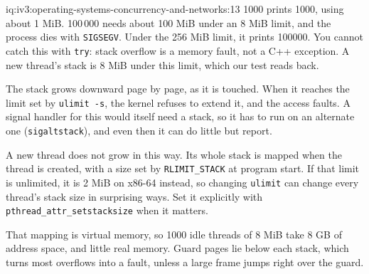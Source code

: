 \begin{solution}{iq:iv3:operating-systems-concurrency-and-networks:13}
1000 prints 1000, using about 1 MiB. 100\,000 needs about 100 MiB under an 8 MiB limit, and the process dies with \texttt{SIGSEGV}. Under the 256 MiB limit, it prints 100000. You cannot catch this with \texttt{try}: stack overflow is a memory fault, not a C++ exception. A new thread's stack is 8 MiB under this limit, which our test reads back.

The stack grows downward page by page, as it is touched. When it reaches the limit set by \texttt{ulimit -s}, the kernel refuses to extend it, and the access faults. A signal handler for this would itself need a stack, so it has to run on an alternate one (\texttt{sigaltstack}), and even then it can do little but report.

A new thread does not grow in this way. Its whole stack is mapped when the thread is created, with a size set by \texttt{RLIMIT\_STACK} at program start. If that limit is unlimited, it is 2 MiB on x86-64 instead, so changing \texttt{ulimit} can change every thread's stack size in surprising ways. Set it explicitly with \texttt{pthread\_attr\_setstacksize} when it matters.

That mapping is virtual memory, so 1000 idle threads of 8 MiB take 8 GB of address space, and little real memory. Guard pages lie below each stack, which turns most overflows into a fault, unless a large frame jumps right over the guard.

\end{solution}


